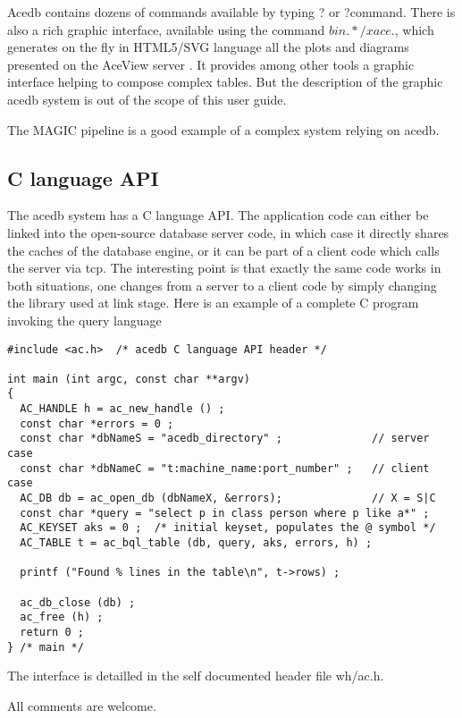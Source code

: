 \documentclass[11pt]{article}
\newcommand{\BL}{\begin{lstlisting}}
\begin{document}
Acedb contains dozens of commands available by typing ? or ?command.
There is also a rich graphic interface, available using the
command $bin.*/xace .$, which generates on the fly in HTML5/SVG language
all the plots and diagrams presented on the AceView server \cite{cDNA}.
It provides among other tools
a graphic interface helping to compose complex tables.
But the description of the graphic acedb system is out of the scope of this 
user guide.

The MAGIC pipeline  \cite{DJTM} is a good example of a complex system 
relying on acedb.



%%%%%%%%%%%%%%%%%%%%%%%%%%%%%%%%%%%%%%%%%%%%%%%%%%%%%%%%%%%%%%%%
% SECTION
%%%%%%%%%%%%%%%%%%%%%%%%%%%%%%%%%%%%%%%%%%%%%%%%%%%%%%%%%%%%%%%%
\subsection{C language API}

The acedb system has a C language API. The application code
can either be linked into the open-source database server code,
in which case it directly shares the caches of the database engine,
or it can be part of a client code which calls the server
via tcp. The interesting point is that exactly the same code
works in both situations, one changes from a server to a client
code by simply changing the library used at link stage.
Here is an example of a complete C program invoking the query language  

\BL
#include <ac.h>  /* acedb C language API header */

int main (int argc, const char **argv)
{
  AC_HANDLE h = ac_new_handle () ;
  const char *errors = 0 ;
  const char *dbNameS = "acedb_directory" ;              // server case
  const char *dbNameC = "t:machine_name:port_number" ;   // client case
  AC_DB db = ac_open_db (dbNameX, &errors);              // X = S|C
  const char *query = "select p in class person where p like a*" ;
  AC_KEYSET aks = 0 ;  /* initial keyset, populates the @ symbol */
  AC_TABLE t = ac_bql_table (db, query, aks, errors, h) ;

  printf ("Found % lines in the table\n", t->rows) ;

  ac_db_close (db) ;
  ac_free (h) ;
  return 0 ;
} /* main */

\end{lstlisting}
The interface is detailled in the self documented header file wh/ac.h.

All comments are welcome.



\end{document}
